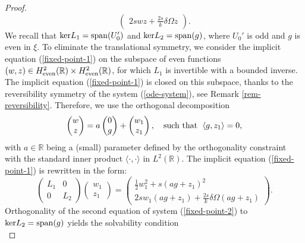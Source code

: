 \documentclass[12pt,reqno]{amsart}
\numberwithin{equation}{section}
\begin{document}
\begin{proof}
\begin{equation}
\begin{pmatrix}
    2 s w z + \frac{2s}{k} \delta \Omega z \end{pmatrix}.
\end{equation}
We recall that $\text{ker}L_1 = {\rm span}(U_0')$ and $\text{ker} L_2 = {\rm span}(g)$, where $U_0'$ is odd and $g$ is even in $\xi$. 
To eliminate the translational symmetry, we consider the implicit equation (\ref{fixed-point-1}) on the subspace of even functions 
$(w,z) \in H^2_{\rm even}(\mathbb{R}) \times H^2_{\rm even}(\mathbb{R})$, for which $L_1$ is invertible with a bounded inverse. 
The implicit equation (\ref{fixed-point-1}) is closed on this subspace, thanks 
to the reversibility symmetry of the system (\ref{ode-system}), see Remark \ref{rem-reversibility}. Therefore, we use the orthogonal decomposition
\begin{equation}
    \label{LSdecomposition}
\begin{pmatrix} w \\ z \end{pmatrix} = a \begin{pmatrix} 0 \\ g\end{pmatrix} + 
\begin{pmatrix} w_1 \\ z_1 \end{pmatrix}, \quad \mbox{\rm such that } \; \langle g, z_1 \rangle = 0, 
\end{equation}
with $a \in \mathbb{R}$ being a (small) parameter defined by the orthogonality constraint with the standard inner product 
$\langle \cdot, \cdot \rangle$ in $L^2(\mathbb{R})$. 
The implicit equation (\ref{fixed-point-1}) is rewritten in the form:
\begin{equation}
    \label{fixed-point-2}
\begin{pmatrix} L_1 & 0  \\ 
0 & L_2 
\end{pmatrix} \begin{pmatrix} w_1 \\ z_1 \end{pmatrix} = \begin{pmatrix} \frac{1}{2} w_1^2 + s (ag+z_1)^2 \\  
    2 s w_1 (a g + z_1) + \frac{2 s}{k} \delta \Omega (a g + z_1) \end{pmatrix}.
\end{equation}
Orthogonality of the second equation of system (\ref{fixed-point-2}) to $\text{ker} L_2 = {\rm span}(g)$ yields the solvability condition 
\begin{equation}

\end{equation}
\end{proof}
\end{document}
